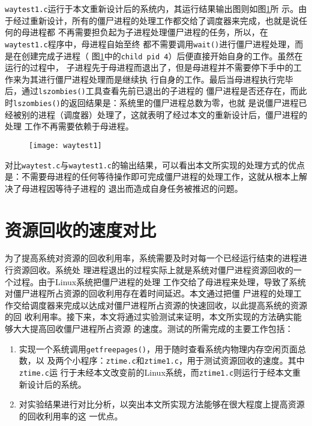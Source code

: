 \documentclass{swfuthesism}
\begin{document}
\texttt{waytest1.c}运行于本文重新设计后的系统内，其运行结果输出图则如图\ref{fig:waytest1}所
示。由于经过重新设计，所有的僵尸进程的处理工作都交给了调度器来完成，也就是说任何的母进程都
不再需要担负起为子进程处理僵尸进程的任务，所以，在\texttt{waytest1.c}程序中，母进程自始至终
都不需要调用\texttt{wait()}进行僵尸进程处理，而是在创建完成子进程（
图\ref{fig:waytest1}中的\texttt{child pid 4}）后便直接开始自身的工作。虽然在运行的过程中，
子进程先于母进程而退出了，但是母进程并不需要停下手中的工作来为其进行僵尸进程处理而是继续执
行自身的工作。最后当母进程执行完毕后，通过\texttt{lszombies()}工具查看先前已退出的子进程的
僵尸进程是否还存在，而此时\texttt{lszombies()}的返回结果是：系统里的僵尸进程总数为零，也就
是说僵尸进程已经被别的进程（调度器）处理了，这就表明了经过本文的重新设计后，僵尸进程的处理
工作不再需要依赖于母进程。

\begin{figure}
  \centering
  \texttt{[image: waytest1]}
  \label{fig:waytest1}
\end{figure}

对比\texttt{waytest.c}与\texttt{waytest1.c}的输出结果，可以看出本文所实现的处理方式的优点
是：不需要母进程的任何等待操作即可完成僵尸进程的处理工作，这就从根本上解决了母进程因等待子进程的
退出而造成自身任务被推迟的问题。

\section{资源回收的速度对比}

为了提高系统对资源的回收利用率，系统需要及时对每一个已经运行结束的进程进行资源回收。系统处
理进程退出的过程实际上就是系统对僵尸进程资源回收的一个过程。由于Linux系统把僵尸进程的处理
工作交给了母进程来处理，导致了系统对僵尸进程所占资源的回收利用存在着时间延迟。本文通过把僵
尸进程的处理工作交给调度器来完成以达成对僵尸进程所占资源的快速回收，以此提高系统的资源的回
收利用率。接下来，本文将通过实验测试来证明，本文所实现的方法确实能够大大提高回收僵尸进程所占资源
的速度。测试的所需完成的主要工作包括：
\begin{enumerate}
\item 实现一个系统调用\texttt{getfreepages()}，用于随时查看系统内物理内存空闲页面总数，以
  及两个小程序：\texttt{ztime.c}和\texttt{ztime1.c}，用于测试资源回收的速度。其中\texttt{ztime.c}运
  行于未经本文改变前的Linux系统，而\texttt{ztime1.c}则运行于经本文重新设计后的系统。
\item 对实验结果进行对比分析，以突出本文所实现方法能够在很大程度上提高资源的回收利用率的这
  一优点。
\end{enumerate}
\end{document}

